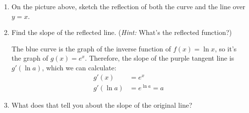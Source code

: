 \documentclass{article}
\begin{document}
\begin{enumerate}
\begin{enumerate}
  \item
    \begin{problem}
      On the picture above, sketch the reflection of both the curve and the line over $y = x$. 
    \end{problem}

    \begin{solution}
      \begin{center}
      \end{center}
    \end{solution}

  \item
    \begin{problem}[\vfill]
      Find the slope of the reflected line. (\emph{Hint:} What's the reflected function?) 
    \end{problem}

    \begin{solution}
      The blue curve is the graph of the inverse function of $f(x) = \ln x$, so it's the graph of $g(x) = e^x$. Therefore, the slope of the purple tangent line is $g'(\ln a)$, which we can calculate:
      \begin{align*}
        g'(x) &= e^x \\
        g'(\ln a) &= e^{\ln a} = a 
      \end{align*}
    \end{solution}

  \item
    \begin{problem}[\stretch{0.5}]
      What does that tell you about the slope of the original line?  
    \end{problem}


\end{enumerate}
\end{enumerate}
\end{document}
